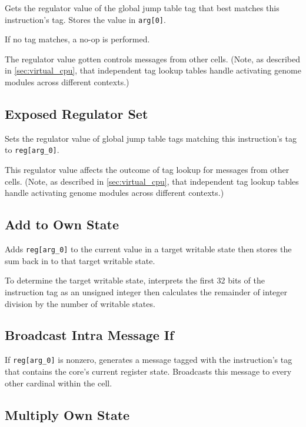 Gets the regulator value of the global jump table tag that best matches this instruction's tag.
Stores the value in \texttt{arg[0]}.

If no tag matches, a no-op is performed.

The regulator value gotten controls messages from other cells.
(Note, as described in \ref{sec:virtual_cpu}, that independent tag lookup tables handle activating genome modules across different contexts.)

\subsection{Exposed Regulator Set}


Sets the regulator value of global jump table tags matching this instruction's tag to \texttt{reg[arg\_0]}.

This regulator value affects the outcome of tag lookup for messages from other cells.
(Note, as described in \ref{sec:virtual_cpu}, that independent tag lookup tables handle activating genome modules across different contexts.)

\subsection{Add to Own State}


Adds \texttt{reg[arg\_0]} to the current value in a target writable state then stores the sum back in to that target writable state.

To determine the target writable state, interprets the first 32 bits of the instruction tag as an unsigned integer then calculates the remainder of integer division by the number of writable states.

\subsection{Broadcast Intra Message If}


If \texttt{reg[arg\_0]} is nonzero, generates a message tagged with the instruction's tag that contains the core's current register state.
Broadcasts this message to every other cardinal within the cell.

\subsection{Multiply Own State}


